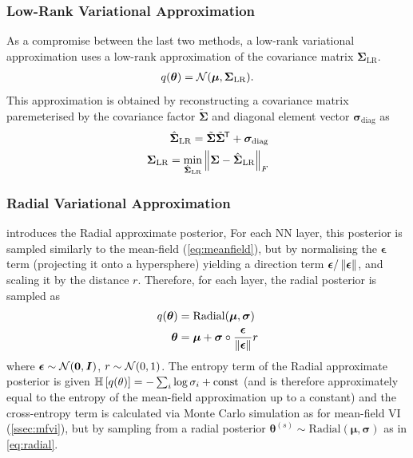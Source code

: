 \documentclass[10pt,a4paper,twocolumn]{article}
\begin{document}
\subsubsection{Low-Rank Variational Approximation}

As a compromise between the last two methods, a low-rank variational approximation uses a low-rank approximation of the covariance matrix \(\bm \Sigma_{\mathrm{LR}}\).
\begin{align}\label{eq:lowrank}
    q(\bm \theta) = \mathcal{N}(\bm \mu, \bm \Sigma_{\mathrm{LR}}).
\end{align}
This approximation is obtained by reconstructing a covariance matrix paremeterised by the covariance factor \(\tilde{\bm \Sigma}\) and diagonal element vector \(\bm \sigma_{\text{diag}}\) as
\begin{align}
    \hat{\bm \Sigma}_{\text{LR}} = \tilde{\bm \Sigma} \tilde{\bm \Sigma}^{\mkern-1.5mu\mathsf{T}} + \bm \sigma_{\text{diag}} \nonumber \\
    \bm \Sigma_{\text{LR}} = \min_{\hat{\bm \Sigma}_{\text{LR}}} \left\lVert\bm \Sigma - \hat{\bm \Sigma}_{\text{LR}}\right\rVert_F \label{eq:lowrank-covariance}
\end{align}

\subsubsection{Radial Variational Approximation}

\textcite{farquhar2020radial} introduces the Radial approximate posterior,
For each NN layer, this posterior is sampled similarly to the mean-field (\cref{eq:meanfield}), but by normalising the \(\bm{\epsilon}\) term (projecting it onto a hypersphere) yielding a direction term \(\bm{\epsilon}/\left\lVert\bm{\epsilon}\right\rVert\), and scaling it by the distance \(r\).
Therefore, for each layer, the radial posterior is sampled as
\begin{align}\label{eq:radial}
    q(\bm \theta) ={} & \mathrm{Radial}(\bm{\mu}, \bm{\sigma}) \nonumber                          \\
    \bm{\theta} ={}   & \bm{\mu} + \bm{\sigma} \circ \frac{\bm{\epsilon}}{\left\lVert\bm{\epsilon}\right\rVert} r
\end{align}
where \(\bm{\epsilon} \sim \mathcal{N}(\bm{0}, \bm{I})\), \(r \sim \mathcal{N}(0, 1)\).
The entropy term of the Radial approximate posterior is given
\(\mathbb{H}\left[q(\theta)\right] = - \sum_i \log \sigma_i + \mathrm{const}\) (and is therefore approximately equal to the entropy of the mean-field approximation up to a constant) and the cross-entropy term is calculated via Monte Carlo simulation as for mean-field VI (\cref{ssec:mfvi}), but by sampling from a radial posterior \(\bm{\theta}^{(s)} \sim \mathrm{Radial}(\bm{\mu}, \bm{\sigma})\) as in \cref{eq:radial}.
\end{document}
